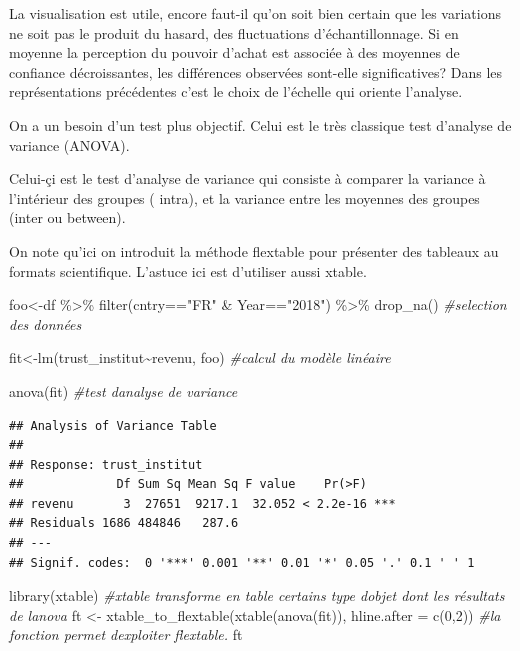 \documentclass[
]{book}
\newenvironment{Shaded}{\begin{snugshade}}{\end{snugshade}}
\newcommand{\AttributeTok}[1]{\textcolor[rgb]{0.77,0.63,0.00}{#1}}
\newcommand{\CommentTok}[1]{\textcolor[rgb]{0.56,0.35,0.01}{\textit{#1}}}
\newcommand{\DecValTok}[1]{\textcolor[rgb]{0.00,0.00,0.81}{#1}}
\newcommand{\FunctionTok}[1]{\textcolor[rgb]{0.00,0.00,0.00}{#1}}
\newcommand{\NormalTok}[1]{#1}
\newcommand{\OtherTok}[1]{\textcolor[rgb]{0.56,0.35,0.01}{#1}}
\newcommand{\SpecialCharTok}[1]{\textcolor[rgb]{0.00,0.00,0.00}{#1}}
\newcommand{\StringTok}[1]{\textcolor[rgb]{0.31,0.60,0.02}{#1}}
\begin{document}
La visualisation est utile, encore faut-il qu'on soit bien certain que les variations ne soit pas le produit du hasard, des fluctuations d'échantillonnage. Si en moyenne la perception du pouvoir d'achat est associée à des moyennes de confiance décroissantes, les différences observées sont-elle significatives? Dans les représentations précédentes c'est le choix de l'échelle qui oriente l'analyse.

On a un besoin d'un test plus objectif. Celui est le très classique test d'analyse de variance (ANOVA).

Celui-çi est le test d'analyse de variance qui consiste à comparer la variance à l'intérieur des groupes ( intra), et la variance entre les moyennes des groupes (inter ou between).

On note qu'ici on introduit la méthode flextable pour présenter des tableaux au formats scientifique. L'astuce ici est d'utiliser aussi xtable.

\begin{Shaded}
\begin{Highlighting}[]
\NormalTok{foo}\OtherTok{\textless{}{-}}\NormalTok{df }\SpecialCharTok{\%\textgreater{}\%} 
  \FunctionTok{filter}\NormalTok{(cntry}\SpecialCharTok{==}\StringTok{"FR"} \SpecialCharTok{\&}\NormalTok{ Year}\SpecialCharTok{==}\StringTok{"2018"}\NormalTok{) }\SpecialCharTok{\%\textgreater{}\%} 
  \FunctionTok{drop\_na}\NormalTok{() }\CommentTok{\#selection des données}

\NormalTok{fit}\OtherTok{\textless{}{-}}\FunctionTok{lm}\NormalTok{(trust\_institut}\SpecialCharTok{\textasciitilde{}}\NormalTok{revenu, foo) }\CommentTok{\#calcul du modèle linéaire}

\FunctionTok{anova}\NormalTok{(fit) }\CommentTok{\#test d\textquotesingle{}analyse de variance}
\end{Highlighting}
\end{Shaded}

\begin{verbatim}
## Analysis of Variance Table
## 
## Response: trust_institut
##             Df Sum Sq Mean Sq F value    Pr(>F)    
## revenu       3  27651  9217.1  32.052 < 2.2e-16 ***
## Residuals 1686 484846   287.6                      
## ---
## Signif. codes:  0 '***' 0.001 '**' 0.01 '*' 0.05 '.' 0.1 ' ' 1
\end{verbatim}

\begin{Shaded}
\begin{Highlighting}[]
\FunctionTok{library}\NormalTok{(xtable) }\CommentTok{\#xtable transforme en table certains type d\textquotesingle{}objet dont les résultats de l\textquotesingle{}anova}
\NormalTok{ft }\OtherTok{\textless{}{-}} \FunctionTok{xtable\_to\_flextable}\NormalTok{(}\FunctionTok{xtable}\NormalTok{(}\FunctionTok{anova}\NormalTok{(fit)), }\AttributeTok{hline.after =} \FunctionTok{c}\NormalTok{(}\DecValTok{0}\NormalTok{,}\DecValTok{2}\NormalTok{)) }\CommentTok{\#la fonction permet d\textquotesingle{}exploiter flextable.}
\NormalTok{ft}
\end{Highlighting}
\end{Shaded}
\end{document}
